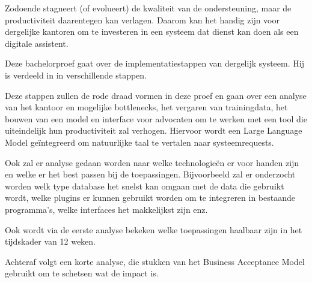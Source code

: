 Zodoende stagneert (of evolueert) de kwaliteit van de ondersteuning, maar de productiviteit daarentegen kan verlagen. 
Daarom kan het handig zijn voor dergelijke kantoren om te investeren in een systeem dat dienst kan doen als een digitale assistent. 

Deze bachelorproef gaat over de implementatiestappen van dergelijk systeem. Hij is verdeeld in in verschillende stappen. 

Deze stappen zullen de rode draad vormen in deze proef en gaan over een analyse van het kantoor en mogelijke bottlenecks, het vergaren van trainingdata, het bouwen van een model en interface
voor advocaten om te werken met een tool die uiteindelijk hun productiviteit zal verhogen. Hiervoor wordt een Large Language Model geïntegreerd om natuurlijke taal te vertalen naar 
systeemrequests. 

Ook zal er analyse gedaan worden naar welke technologieën er voor handen zijn en welke er het best passen bij de toepassingen. Bijvoorbeeld zal er onderzocht worden welk type database
het snelst kan omgaan met de data die gebruikt wordt, welke plugins er kunnen gebruikt worden om te integreren in bestaande programma's, welke interfaces het makkelijkst zijn enz. 

Ook wordt via de eerste analyse bekeken welke toepassingen haalbaar zijn in het tijdskader van 12 weken. 

Achteraf volgt een korte analyse, die stukken van het Business Acceptance Model gebruikt om te schetsen wat de impact is.
